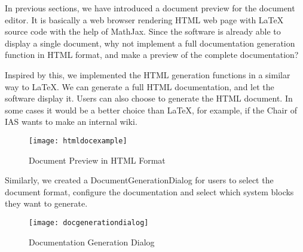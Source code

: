 In previous sections, we have introduced a document preview for the document editor.  It is basically a web browser rendering HTML web page with LaTeX source code with the help of MathJax. Since the software is already able to display a single document, why not implement a full documentation generation function in HTML format, and make a preview of the complete documentation?

Inspired by this, we implemented the HTML generation functions in a similar way to LaTeX. We can generate a full HTML documentation, and let the software display it. Users can also choose to generate the HTML document. In some cases it would be a better choice than LaTeX, for example, if the Chair of IAS wants to make an internal wiki.

\begin{figure}[htbp]
\centering
\texttt{[image: htmldocexample]}
\caption{Document Preview in HTML Format\label{fig:Document Preview in HTML Format}}
\end{figure} 

Similarly, we created a DocumentGenerationDialog for users to select the document format, configure the documentation and select which system blocks they want to generate.

\begin{figure}[htbp]
\centering
\texttt{[image: docgenerationdialog]}
\caption{Documentation Generation Dialog\label{fig:Documentation Generation Dialog}}
\end{figure} 
